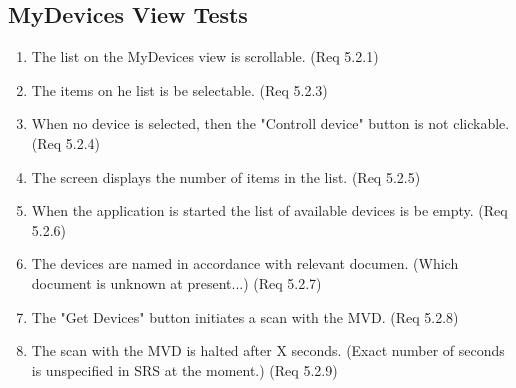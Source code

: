\documentclass[a4paper]{article}
\newlength{\testlabellength}
\newenvironment{testlist}{\begin{enumerate}[label=\bfseries Test \thesubsection.\arabic* , labelindent=0pt, labelwidth=\testlabellength , leftmargin=2cm]}{\end{enumerate}}
\begin{document}
\begin{appendices}
\subsection{MyDevices View Tests}
\begin{testlist}
	\item The list on the MyDevices view is scrollable. (Req 5.2.1)
    \item The items on he list is be selectable. (Req 5.2.3)
    \item When no device is selected, then the "Controll device" button is not clickable. (Req 5.2.4)
    \item The screen displays the number of items in the list. (Req 5.2.5)
    \item When the application is started the list of available devices is be empty. (Req 5.2.6)
    \item The devices are named in accordance with relevant documen. (Which document is unknown at present...) (Req 5.2.7)
    \item The "Get Devices" button initiates a scan with the MVD. (Req 5.2.8)
    \item The scan with the MVD is halted after X seconds. (Exact number of seconds is unspecified in SRS at the moment.) (Req 5.2.9)
\end{testlist}

\end{appendices}
\end{document}
